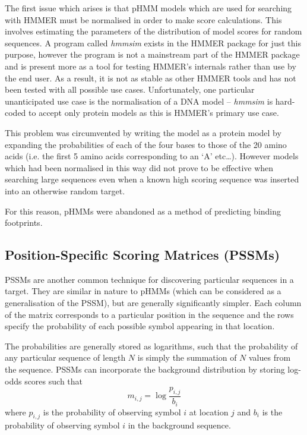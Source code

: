 The first issue which arises is that pHMM models which are used for searching
with HMMER must be normalised in order to make score calculations.
This involves estimating the parameters of the distribution of model scores 
for random sequences.
A program called \emph{hmmsim} exists in the HMMER package for just 
this purpose, however the program is not a mainstream part of the HMMER package
and is present more as a tool for testing HMMER's internals rather than use by
the end user.
As a result, it is not as stable as other HMMER tools and has not been tested
with all possible use cases.
Unfortunately, one particular unanticipated use case is the normalisation of a
DNA model -- \emph{hmmsim} is hard-coded to accept only protein models as this
is HMMER's primary use case.

This problem was circumvented by writing the model as a protein model by
expanding the probabilities of each of the four bases to those of the 20 
amino acids (i.e. the first 5 amino acids corresponding to an `A' etc\ldots).
However models which had been normalised in this way did not prove to be
effective when searching large sequences even when a known high scoring
sequence was inserted into an otherwise random target.

For this reason, pHMMs were abandoned as a method of predicting binding
footprints.


\subsection{Position-Specific Scoring Matrices (PSSMs)}
\label{sec:pssm_binding}

PSSMs are another common technique for discovering particular sequences in a
target.
They are similar in nature to pHMMs (which can be considered as a
generalisation of the PSSM), but are generally significantly simpler.
Each column of the matrix corresponds to a particular position in the sequence and
the rows specify the probability of each possible symbol appearing in that
location.

The probabilities are generally stored as logarithms, such that the probability
of any particular sequence of length $N$ is simply the summation of $N$ values
from the sequence.
PSSMs can incorporate the background distribution by storing log-odds scores
such that
\begin{equation*}
  m_{i,j} = \log {\frac{p_{i,j}}{b_i}}
\end{equation*}
where $p_{i,j}$ is the probability of observing symbol $i$ at location $j$ and
$b_i$ is the probability of observing symbol $i$ in the background sequence.

